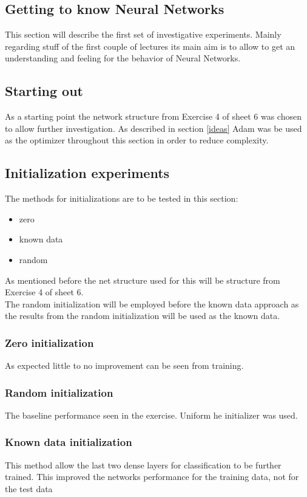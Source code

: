 \documentclass{article}
\begin{document}
\begin{multicols}{2}
\section{Getting to know Neural Networks}
This section will describe the first set of investigative experiments. Mainly regarding stuff of the first couple of lectures its main aim is to allow to get an understanding and feeling for the behavior of Neural Networks.

\subsection{Starting out}
As a starting point the network structure from Exercise 4 of sheet 6 was chosen to allow further investigation. As described in section \ref{ideas} Adam was be used as the optimizer throughout this section in order to reduce complexity.

\subsection{Initialization experiments}
The methods for initializations are to be tested in this section:
\begin{itemize}
	\item zero
	\item known data
	\item random
\end{itemize}
As mentioned before the net structure used for this will be structure from Exercise 4 of sheet 6.\\
The random initialization will be employed before the known data approach as the results from the random initialization will be used as the known data.
\subsubsection{Zero initialization}
As expected little to no improvement can be seen from training.
\subsubsection{Random initialization}
The baseline performance seen in the exercise. Uniform he initializer was used.
\subsubsection{Known data initialization}
This method allow the last two dense layers for classification to be further trained. This improved the networks performance for the training data, not for the test data


\end{multicols}
\end{document}
